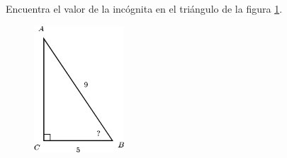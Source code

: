 Encuentra el valor de la incógnita en el triángulo de la figura \ref{fig:angle_functrig_15}.
\begin{figure}[H]
    \begin{center}
        \includegraphics[width=0.3\textwidth]{../images/angle_functrig_15.png}
    \end{center}
    \caption{}
    \label{fig:angle_functrig_15}
\end{figure}